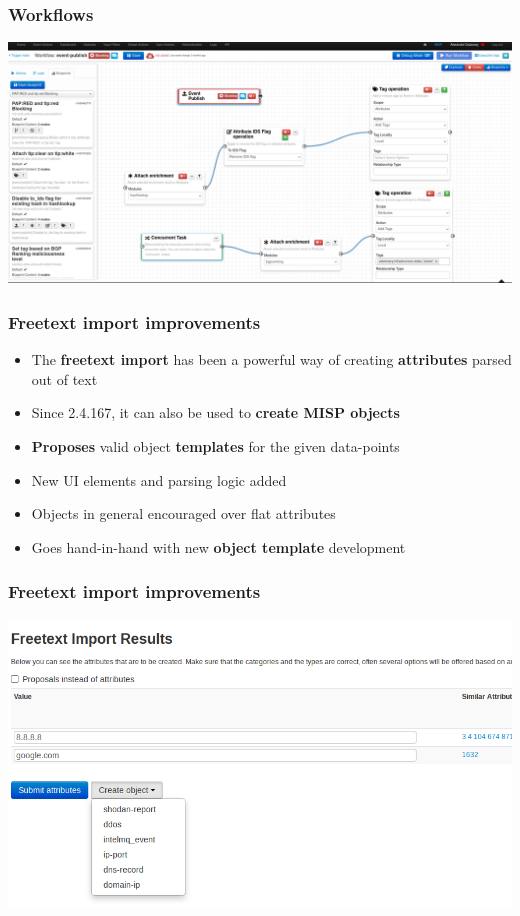 \begin{frame}
\frametitle{Workflows}
\begin{center}
\includegraphics[scale=0.17]{images/workflows_filtered.png}
\end{center}
\end{frame}

\begin{frame}
  \frametitle{Freetext import improvements}
  \begin{itemize}
      \item The {\bf freetext import} has been a powerful way of creating {\bf attributes} parsed out of text
      \item Since 2.4.167, it can also be used to {\bf create MISP objects }
      \item {\bf Proposes} valid object {\bf templates} for the given data-points
      \item New UI elements and parsing logic added
      \item Objects in general encouraged over flat attributes
      \item Goes hand-in-hand with new {\bf object template} development
  \end{itemize}
\end{frame}

\begin{frame}
\frametitle{Freetext import improvements}
\begin{center}
\includegraphics[scale=0.40]{images/freetext_objects.png}
\end{center}
\end{frame}


